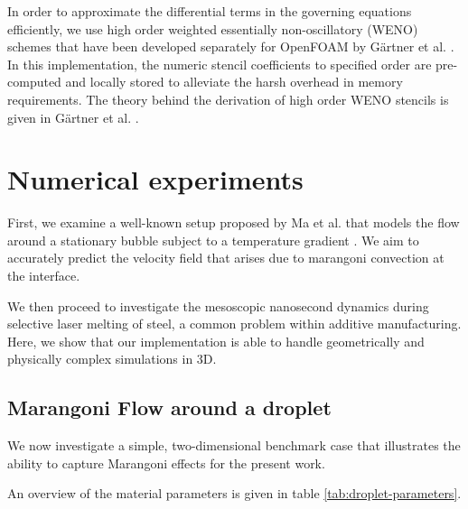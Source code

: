 \documentclass[conference,final,a4paper]{IEEEtran}
\begin{document}
In order to approximate the differential terms in the governing equations efficiently, we use high order weighted essentially non-oscillatory (WENO) schemes that have been developed separately for OpenFOAM by Gärtner et al. \cite{gartnerEfficientWENOLibrary2020,martinImplementationValidationSemiImplicit2018}. In this implementation, the numeric stencil coefficients to specified order are pre-computed and locally stored to alleviate the harsh overhead in memory requirements. The theory behind the derivation of high order WENO stencils is given in Gärtner et al. \cite{gartnerEfficientWENOLibrary2020}.

\section{Numerical experiments}

First, we examine a well-known setup proposed by Ma et al. that models the flow around a stationary bubble subject to a temperature gradient \cite{maDirectNumericalSimulation2011}. We aim to accurately predict the velocity field that arises due to marangoni convection at the interface.

We then proceed to investigate the mesoscopic nanosecond dynamics during selective laser melting of steel, a common problem within additive manufacturing. Here, we show that our implementation is able to handle geometrically and physically complex simulations in 3D.


\subsection{Marangoni Flow around a droplet}\label{sec:droplet}

We now investigate a simple, two-dimensional benchmark case that illustrates the ability to capture Marangoni effects for the present work.

An overview of the material parameters is given in table \ref{tab:droplet-parameters}.
\end{document}
